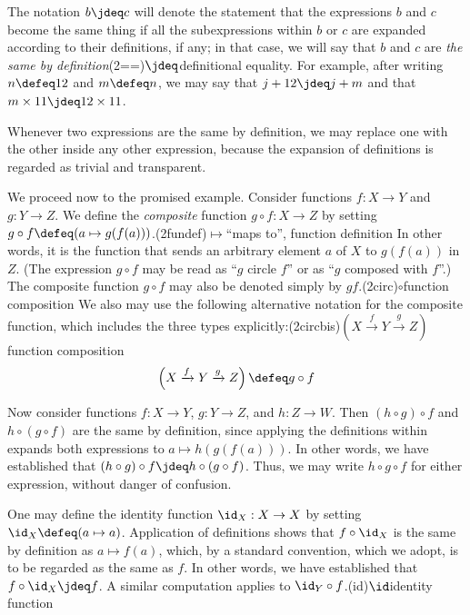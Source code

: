 The notation $b \jdeq c$ will denote the statement that the expressions $b$ and $c$ become the same thing if all the subexpressions within $b$
or $c$ are expanded according to their definitions, if any; in that case, we will say that $b$ and $c$ are \emph{the same by
definition}\glossary(2==){$\jdeq$}{definitional equality}.  For example, after writing $n \defeq 12$ and $m \defeq n$, we may say that $j + 12
\jdeq j + m$ and that $m \times 11 \jdeq 12 \times 11$.

Whenever two expressions are the same by definition, we may replace one with the other inside any other expression, because the expansion of
definitions is regarded as trivial and transparent.

We proceed now to the promised example.  Consider functions $f : X \to Y$ and $g : Y \to Z$.  We define the \emph{composite} function $g \circ f
: X \to Z$ by setting $g \circ f \defeq (a \mapsto g(f(a)))$.\glossary(2fundef){$\mapsto$}{``maps to'', function definition} In other words, it
is the function that sends an arbitrary element $a$ of $X$ to $g(f(a))$ in $Z$.  (The expression $g \circ f$ may be read as ``$g$ circle $f$''
or as ``$g$ composed with $f$''.)  The composite function $g \circ f$ may also be denoted simply by $gf$.\glossary(2circ){$\circ$}{function composition}
We also may use the following alternative notation for the composite function, which includes the three
types explicitly:\glossary(2circbis){$ ( X \xrightarrow f Y \xrightarrow g Z ) $}{function composition}
\[
  \left( X \xrightarrow f Y \xrightarrow g Z \right) \defeq g \circ f
\]

Now consider functions $f : X \to Y$, $g : Y \to Z$, and $h : Z \to W$.  Then $(h \circ g) \circ f$ and $h \circ (g \circ f)$ are the same by
definition, since applying the definitions within expands both expressions to $a \mapsto h(g(f(a)))$.  In other
words, we have established that $(h \circ g) \circ f \jdeq h \circ (g \circ f)$.  Thus, we may write $h \circ g \circ f$ for
either expression, without danger of confusion.

One may define the identity function $\id_X : X \to X$ by setting $\id_X \defeq (a \mapsto a)$.  Application of definitions shows that
$f \circ \id_X$ is the same by definition as $a \mapsto f(a)$, which, by a standard convention, which we adopt, is to be regarded as the same as $f$.  In
other words, we have established that $f \circ \id_X \jdeq f$.\label{page:idofetaf}
A similar computation applies to $\id_Y \circ f$.\glossary(id){$\id$}{identity function}

